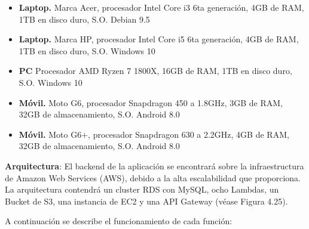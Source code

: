 \begin{itemize}
	\item \textbf{Laptop.} Marca Acer, procesador Intel Core i3 6ta generación, 4GB de RAM, 1TB en disco duro, S.O. Debian 9.5
	\item \textbf{Laptop.} Marca HP, procesador Intel Core i5 6ta generación, 4GB de RAM, 1TB en disco duro, S.O. Windows 10
	\item \textbf{PC} Procesador AMD Ryzen 7 1800X, 16GB de RAM, 1TB en disco duro, S.O. Windows 10
	\item \textbf{Móvil.} Moto G6, procesador Snapdragon 450 a 1.8GHz, 3GB de RAM, 32GB de almacenamiento, S.O. Android 8.0
	\item \textbf{Móvil.} Moto G6+, procesador Snapdragon 630 a 2.2GHz, 4GB de RAM, 32GB de almacenamiento, S.O. Android 8.0	
\end{itemize}
\noindent
\textbf{Arquitectura}:
El backend de la aplicación se encontrará sobre la infraestructura de Amazon Web Services (AWS), debido a la alta escalabilidad que proporciona. La arquitectura contendrá un cluster RDS con MySQL, ocho Lambdas, un Bucket de S3, una instancia de EC2 y una API Gateway (véase Figura 4.25).\par
A continuación se describe el funcionamiento de cada función:\par
